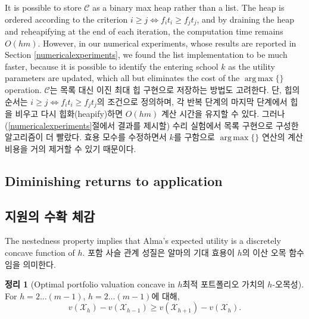 \documentclass[11pt]{article} %
\DeclareMathOperator*{\argmax}{arg\,max}
\newtheorem{theorem}{Theorem}
\theoremstyle{definition}
\newtheorem{theorem}{정리}
\theoremstyle{definition}
\begin{document}
\ifen 
It is possible to store $\mathcal{C}$ as a binary max heap rather than a list. The heap is ordered according to the criterion $i \geq j \iff f_i t_i \geq f_j t_j$, and by draining the heap and reheapifying at the end of each iteration, the computation time remains $O(hm)$. However, in our numerical experiments, whose results are reported in Section \ref{numericalexperiments},
we found the list implementation to be much faster, because it is possible to identify the entering school $k$ as the utility parameters are updated, which all but eliminates the cost of the $\argmax\{\}$ operation. 
\else
$\mathcal{C}$는 목록 대신 이진 최대 힙 구현으로 저장하는 방법도 고려한다. 단, 힙의 순서는 $i \geq j \iff f_i t_i \geq f_j t_j$의 조건으로 정의하며, 각 반복 단계의 마지막 단계에서 힙을 비우고 다시 힙화(heapify)하면 $O(hm)$ 계산 시간을 유지할 수 있다. 그러나 (\ref{numericalexperiments}절에서 결과를 제시할) 수리 실험에서 목록 구현으로 구성한 알고리즘이 더 빨랐다. 효용 모수를 수정하면서 $k$를 구함으로 $\argmax\{\}$ 연산의 계산 비용을 거의 제거할 수 있기 때문이다.
\fi


\ifen \subsection{Diminishing returns to application} \else\subsection{지원의 수확 체감} \fi
\ifen The nestedness property implies that Alma's expected utility is a discretely concave function of $h$.
\else 포함 사슬 관계 성질은 알마의 기대 효용이 $h$의 이산 오목 함수임을 의미한다.\fi

\begin{theorem}[\ifen Optimal portfolio valuation concave in $h$\else 최적 포트폴리오 가치의 $h$-오목성\fi] \label{concavityinh}
\ifen For $h = 2 \dots (m-1)$,
\else $h = 2 \dots (m-1)$에 대해,\fi
\begin{equation}v(\mathcal{X}_h) - v(\mathcal{X}_{h-1}) \geq v(\mathcal{X}_{h+1}) - v(\mathcal{X}_{h}).\end{equation} 
\end{theorem}
\end{document}
